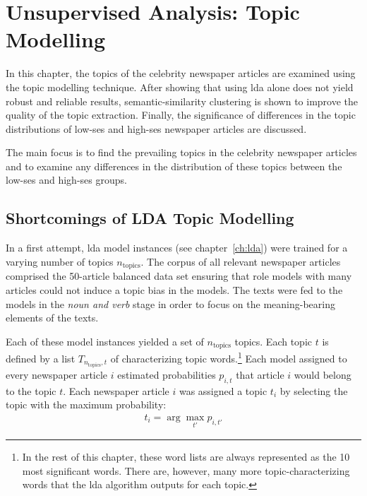 \renewcommand{\imagepath}{../50-unsupervised/img}
\newcommand{\ntopics}{n_\text{topics}}
\newcommand{\nclusters}{n_\text{clusters}}

\chapter{Unsupervised Analysis: Topic Modelling}\label{ch:unsupervised}
In this chapter, the topics of the celebrity newspaper articles are examined using the topic modelling technique. After showing that using \gls{lda} alone does not yield robust and reliable results, semantic-similarity clustering is shown to improve the quality of the topic extraction.  Finally, the significance of differences in the topic distributions of low-\gls{ses} and high-\gls{ses} newspaper articles are discussed.

The main focus is to find the prevailing topics in the celebrity newspaper articles and to examine any differences in the distribution of these topics between the low-\gls{ses} and high-\gls{ses} groups.

\section{Shortcomings of LDA Topic Modelling}
In a first attempt, \gls{lda} model instances (see chapter~\ref{ch:lda}) were trained for a varying number of topics $\ntopics$. The corpus of all relevant newspaper articles comprised the 50-article balanced data set ensuring that role models with many articles could not induce a topic bias in the models. The texts were fed to the models in the \textit{noun and verb} stage in order to focus on the meaning-bearing elements of the texts.

Each of these model instances yielded a set of $\ntopics$ topics. Each topic $t$ is defined by a list $T_{\ntopics, t}$ of characterizing topic words.\footnote{In the rest of this chapter, these word lists are always represented as the 10 most significant words. There are, however, many more topic-characterizing words that the \gls{lda} algorithm outputs for each topic.} Each model assigned to every newspaper article $i$ estimated probabilities $p_{i, t}$ that article $i$ would belong to the topic $t$. Each newspaper article $i$ was assigned a topic $t_i$ by selecting the topic with the maximum probability:
\begin{align}
    t_i = \arg \max_{t'} p_{i, t'}
\end{align}

